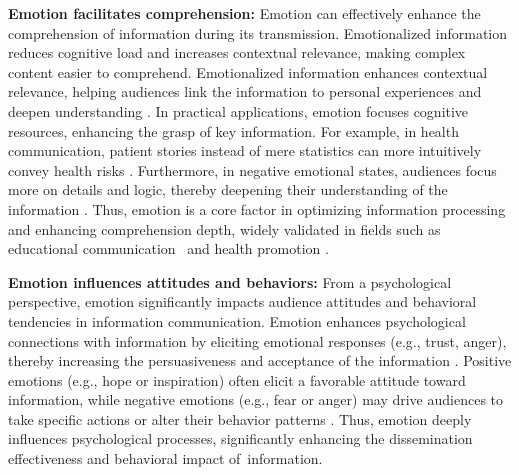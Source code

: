 \textbf{Emotion facilitates comprehension:} Emotion can effectively enhance the comprehension of information during its transmission. Emotionalized information reduces cognitive load and increases contextual relevance, making complex content easier to comprehend. Emotionalized information enhances contextual relevance, helping audiences link the information to personal experiences and deepen understanding \cite{megalakaki2019effects, egidi2012emotional}. In practical applications, emotion focuses cognitive resources, enhancing the grasp of key information. For example, in health communication, patient stories instead of mere statistics can more intuitively convey health risks \cite{lopez2021translating}. Furthermore, in negative emotional states, audiences focus more on details and logic, thereby deepening their understanding of the information \cite{arfe2023effects}. Thus, emotion is a core factor in optimizing information processing and enhancing comprehension depth, widely validated in fields such as educational communication~\cite{megalakaki2019effects} and health promotion \cite{lopez2021translating}.

\textbf{Emotion influences attitudes and behaviors:} From a psychological perspective, emotion significantly impacts audience attitudes and behavioral tendencies in information communication. Emotion enhances psychological connections with information by eliciting emotional responses (e.g., trust, anger), thereby increasing the persuasiveness and acceptance of the information \cite{lopez2021translating}. Positive emotions (e.g., hope or inspiration) often elicit a favorable attitude toward information, while negative emotions (e.g., fear or anger) may drive audiences to take specific actions or alter their behavior patterns \cite{berger2012makes, schreiner2021impact}. Thus, emotion deeply influences psychological processes, significantly enhancing the dissemination effectiveness and behavioral impact of~information.

